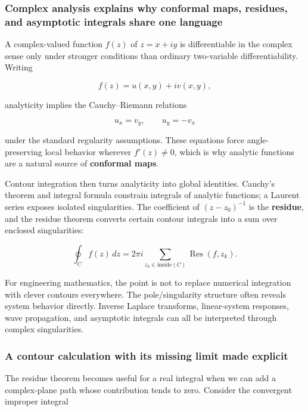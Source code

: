 \subsubsection{Complex analysis explains why conformal maps, residues, and asymptotic integrals share one language}\label{02-foundations-ii-ch025-complex-analysis-explains-why-conformal-maps-residues-and-asymptotic-integrals-share-one-language}

A complex-valued function \(f(z)\) of \(z=x+iy\) is differentiable in the complex sense only under stronger conditions than ordinary two-variable differentiability. Writing

\[
f(z)=u(x,y)+iv(x,y),
\]

analyticity implies the Cauchy--Riemann relations

\[
u_x=v_y,\qquad u_y=-v_x
\]

under the standard regularity assumptions. These equations force angle-preserving local behavior wherever \(f'(z)\neq0\), which is why analytic functions are a natural source of \textbf{conformal maps}.

Contour integration then turns analyticity into global identities. Cauchy's theorem and integral formula constrain integrals of analytic functions; a Laurent series exposes isolated singularities. The coefficient of \((z-z_0)^{-1}\) is the \textbf{residue}, and the residue theorem converts certain contour integrals into a sum over enclosed singularities:

\[
\oint_C f(z)\,dz
=
2\pi i
\sum_{z_k\in\mathrm{inside}(C)}
\operatorname{Res}(f,z_k).
\]

For engineering mathematics, the point is not to replace numerical integration with clever contours everywhere. The pole/singularity structure often reveals system behavior directly. Inverse Laplace transforms, linear-system responses, wave propagation, and asymptotic integrals can all be interpreted through complex singularities.

\subsubsection{A contour calculation with its missing limit made explicit}\label{02-foundations-ii-ch025-a-contour-calculation-with-its-missing-limit-made-explicit}

The residue theorem becomes useful for a real integral when we can add a complex-plane path whose contribution tends to zero. Consider the convergent improper integral

